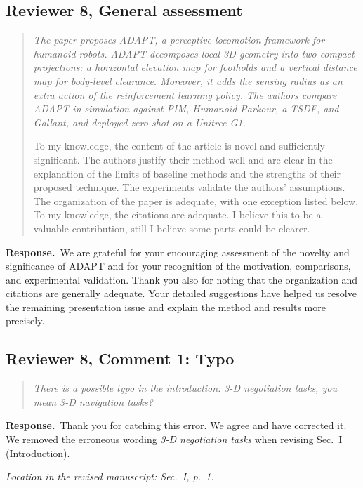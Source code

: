 \documentclass[11pt]{article}
\newenvironment{reviewcomment}{\begin{quote}\color{reviewblue}\itshape}{\end{quote}}
\newcommand{\Response}{\par\noindent\textbf{Response.}\ }
\newcommand{\Location}[1]{\par\noindent\textit{Location in the revised manuscript: #1}}
\begin{document}
\subsection*{Reviewer 8, General assessment}
\begin{reviewcomment}
The paper proposes ADAPT, a perceptive locomotion framework for humanoid robots. ADAPT decomposes local 3D geometry into two compact projections: a horizontal elevation map for footholds and a vertical distance map for body-level clearance. Moreover, it adds the sensing radius as an extra action of the reinforcement learning policy. The authors compare ADAPT in simulation against PIM, Humanoid Parkour, a TSDF, and Gallant, and deployed zero-shot on a Unitree G1.

To my knowledge, the content of the article is novel and sufficiently significant. The authors justify their method well and are clear in the explanation of the limits of baseline methods and the strengths of their proposed technique. The experiments validate the authors' assumptions. The organization of the paper is adequate, with one exception listed below. To my knowledge, the citations are adequate. I believe this to be a valuable contribution, still I believe some parts could be clearer.
\end{reviewcomment}
\Response We are grateful for your encouraging assessment of the novelty and significance of ADAPT and for your recognition of the motivation, comparisons, and experimental validation. Thank you also for noting that the organization and citations are generally adequate. Your detailed suggestions have helped us resolve the remaining presentation issue and explain the method and results more precisely.

\subsection*{Reviewer 8, Comment 1: Typo}
\begin{reviewcomment}
There is a possible typo in the introduction: 3-D negotiation tasks, you mean 3-D navigation tasks?
\end{reviewcomment}
\Response Thank you for catching this error. We agree and have corrected it. We removed the erroneous wording \textit{3-D negotiation tasks} when revising Sec.~I (Introduction).
\Location{Sec.~I, p.~1.}
\end{document}
